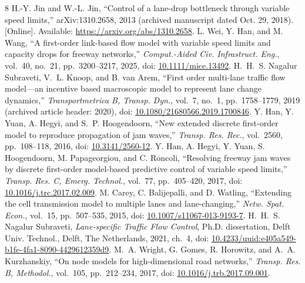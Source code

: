 \documentclass[10pt,a4paper]{article}
\newcommand{\head}[1]{\par\vspace{5pt}\noindent\textbf{#1}\par\nobreak\vspace{1pt}}
\begin{document}
\clearpage
\makeatletter
\renewcommand{\section}{\@ifstar{\head}{\head}}
\makeatother
\begin{thebibliography}{8}
\setlength{\itemsep}{4pt}\setlength{\parskip}{0pt}
 H.-Y. Jin and W.-L. Jin, ``Control of a lane-drop bottleneck
through variable speed limits,'' arXiv:1310.2658, 2013 (archived manuscript
dated Oct. 29, 2018). [Online]. Available:
\url{https://arxiv.org/abs/1310.2658}.
 L. Wei, Y. Han, and M. Wang, ``A first-order link-based flow
model with variable speed limits and capacity drops for freeway networks,''
\emph{Comput.-Aided Civ. Infrastruct. Eng.}, vol.~40, no.~21,
pp.~3200--3217, 2025, doi:
\href{https://doi.org/10.1111/mice.13492}{10.1111/mice.13492}.
 H.~H.~S. Nagalur Subraveti, V.~L. Knoop, and B. van Arem,
``First order multi-lane traffic flow model---an incentive based macroscopic
model to represent lane change dynamics,'' \emph{Transportmetrica B, Transp.
Dyn.}, vol.~7, no.~1, pp.~1758--1779, 2019 (archived article header: 2020),
doi: \href{https://doi.org/10.1080/21680566.2019.1700846}{10.1080/21680566.2019.1700846}.
 Y. Han, Y. Yuan, A. Hegyi, and S.~P. Hoogendoorn,
``New extended discrete first-order model to reproduce propagation of jam
waves,'' \emph{Transp. Res. Rec.}, vol.~2560, pp.~108--118, 2016, doi:
\href{https://doi.org/10.3141/2560-12}{10.3141/2560-12}.
 Y. Han, A. Hegyi, Y. Yuan, S. Hoogendoorn,
M. Papageorgiou, and C. Roncoli, ``Resolving freeway jam waves by discrete
first-order model-based predictive control of variable speed limits,''
\emph{Transp. Res. C, Emerg. Technol.}, vol.~77, pp.~405--420, 2017, doi:
\href{https://doi.org/10.1016/j.trc.2017.02.009}{10.1016/j.trc.2017.02.009}.
 M. Carey, C. Balijepalli, and D. Watling, ``Extending the
cell transmission model to multiple lanes and lane-changing,''
\emph{Netw. Spat. Econ.}, vol.~15, pp.~507--535, 2015, doi:
\href{https://doi.org/10.1007/s11067-013-9193-7}{10.1007/s11067-013-9193-7}.
 H.~H.~S. Nagalur Subraveti, \emph{Lane-specific Traffic
Flow Control}, Ph.D. dissertation, Delft Univ. Technol., Delft, The
Netherlands, 2021, ch.~4, doi:
\href{https://doi.org/10.4233/uuid:e405a549-b1fe-4fa1-8090-4429612359d9}{10.4233/uuid:e405a549-b1fe-4fa1-8090-4429612359d9}.
 M.~A. Wright, G. Gomes, R. Horowitz, and
A.~A. Kurzhanskiy, ``On node models for high-dimensional road networks,''
\emph{Transp. Res. B, Methodol.}, vol.~105, pp.~212--234, 2017, doi:
\href{https://doi.org/10.1016/j.trb.2017.09.001}{10.1016/j.trb.2017.09.001}.
\end{thebibliography}
\end{document}
